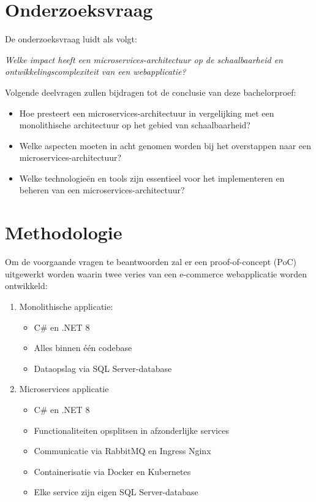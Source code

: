 \section{Onderzoeksvraag}

De onderzoeksvraag luidt als volgt:

\textit{Welke impact heeft een microservices-architectuur op de schaalbaarheid en ontwikkelingscomplexiteit van een webapplicatie?}

Volgende deelvragen zullen bijdragen tot de conclusie van deze bachelorproef:

\begin{itemize}
	\item Hoe presteert een microservices-architectuur in vergelijking met een monolithische architectuur op het gebied van schaalbaarheid?
	\item Welke aspecten moeten in acht genomen worden bij het overstappen naar een microservices-architectuur?
	\item Welke technologieën en tools zijn essentieel voor het implementeren en beheren van een microservices-architectuur?
\end{itemize}

\section{Methodologie}

Om de voorgaande vragen te beantwoorden zal er een proof-of-concept (PoC) uitgewerkt worden waarin twee veries van een e-commerce webapplicatie worden ontwikkeld:

\begin{enumerate}
	\item Monolithische applicatie:
	\begin{itemize}
		\item C\# en .NET 8
		\item Alles binnen één codebase
		\item Dataopslag via SQL Server-database
	\end{itemize}
	\item Microservices applicatie
	\begin{itemize}
		\item C\# en .NET 8
		\item Functionaliteiten opsplitsen in afzonderlijke services
		\item Communicatie via RabbitMQ en Ingress Nginx
		\item Containerisatie via Docker en Kubernetes
		\item Elke service zijn eigen SQL Server-database
	\end{itemize}
\end{enumerate}

